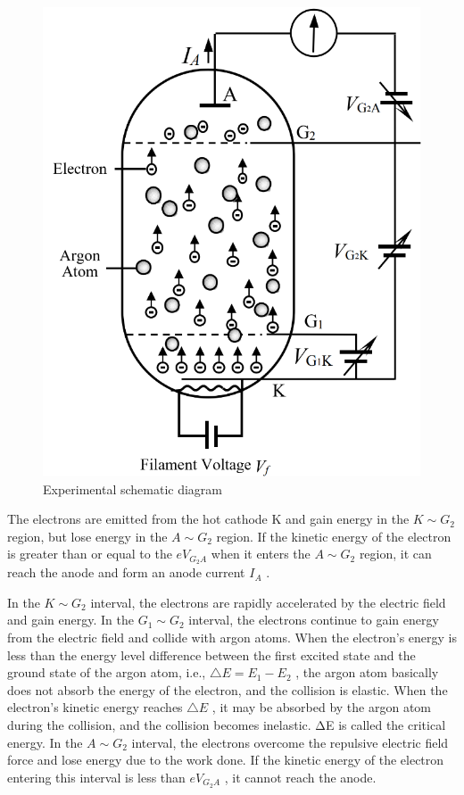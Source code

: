 \documentclass[UTF8]{article}
\begin{document}
	\begin{figure}[H]
        	\centering
        	\includegraphics[clip,scale=1,trim={0 0 0 0}]{fig/fig3.png}
            \caption{Experimental schematic diagram}
            \label{figure.3}
   \end{figure} 
   
   The electrons are emitted from the hot cathode K and gain energy in the $K\sim G_2$ region, but lose energy in the $A\sim G_2$ region. If the kinetic energy of the electron is greater than or equal to the $eV_{G_2A}$  when it enters the $A\sim G_2$ region, it can reach the anode and form an anode current $I_A$ .
   
   In the $K\sim G_2$ interval, the electrons are rapidly accelerated by the electric field and gain energy. In the $G_1\sim G_2$ interval, the electrons continue to gain energy from the electric field and collide with argon atoms. When the electron's energy is less than the energy level difference between the first excited state and the ground state of the argon atom, i.e., $\bigtriangleup E = E_1-E_2$ , the argon atom basically does not absorb the energy of the electron, and the collision is elastic. When the electron's kinetic energy reaches $\bigtriangleup E$ , it may be absorbed by the argon atom during the collision, and the collision becomes inelastic. ΔE is called the critical energy. In the $A\sim G_2$ interval, the electrons overcome the repulsive electric field force and lose energy due to the work done. If the kinetic energy of the electron entering this interval is less than $eV_{G_2A}$ , it cannot reach the anode.
   
\end{document}
